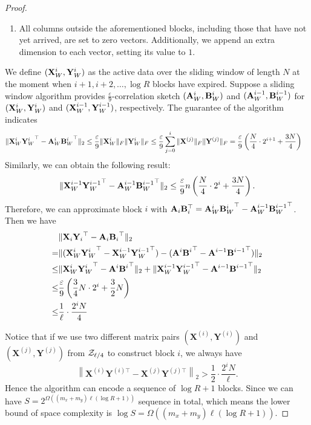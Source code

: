\begin{proof}
\begin{enumerate}
    \item All columns outside the aforementioned blocks, including those that have not yet arrived, are set to zero vectors. Additionally, we append an extra dimension to each vector, setting its value to $1$. 
\end{enumerate}

We define $({\bf X}_W^i,{\bf Y}_W^i)$ as the active data over the sliding window of length $N$ at the moment when $i+1,i+2,\dots,\log{R}$ blocks have expired. Suppose a sliding window algorithm provides $\frac{\varepsilon}{9}$-correlation sketch $({\bf A}_W^i,{\bf B}_W^i)$ and $({\bf A}_W^{i-1},{\bf B}_W^{i-1})$ for $({\bf X}_W^i,{\bf Y}_W^i)$ and $({\bf X}_W^{i-1},{\bf Y}_W^{i-1})$, respectively. The guarantee of the algorithm indicates
\begin{align}
    \| {\bf X}_W^i{{\bf Y}_W^{i}}^\top - {\bf A}_W^i{{\bf B}_W^{i}}^\top \|_2 &\leq \frac{\varepsilon}{9} \|{\bf X}_W^i\|_F\|{\bf Y}_W^i\|_F \leq  \frac{\varepsilon}{9} \sum_{j=0}^i{\|{\bf X}^{(j)}\|_F\|{\bf Y}^{(j)}\|_F} = \frac{\varepsilon}{9}\left( \frac{N}{4}\cdot2^{i+1}+\frac{3N}{4} \right)\nonumber
\end{align}
Similarly, we can obtain the following result:  
\[
\| {\bf X}_W^{i-1} {{\bf Y}_W^{i-1}}^\top - {\bf A}_W^{i-1} {{\bf B}_W^{i-1}}^\top \|_2 \leq \frac{\varepsilon}{9} n \left( \frac{N}{4} \cdot 2^i + \frac{3N}{4} \right).
\]
Therefore, we can approximate block $i$ with ${\bf A}_i{\bf B}_i^\top={\bf A}_W^i{{\bf B}_W^{i}}^\top-{\bf A}_W^{i-1} {{\bf B}_W^{i-1}}^\top$. Then we have
\begin{align}
    &\| {\bf X}_i{{\bf Y}_{i}}^\top - {\bf A}_{i}{{\bf B}_{i}}^\top \|_2 \nonumber\\
    = &\| ({\bf X}_W^i{{\bf Y}_W^{i}}^\top- {\bf X}_W^{i-1}{{\bf Y}_W^{i-1}}^\top) - ({\bf A}^i{{\bf B}^{i}}^\top - {\bf A}^{i-1}{{\bf B}^{i-1}}^\top) \|_2 \nonumber\\
    \leq & \| {\bf X}_W^i{{\bf Y}_W^{i}}^\top- {\bf A}^i{{\bf B}^{i}}^\top\|_2 + \| {\bf X}_W^{i-1}{{\bf Y}_W^{i-1}}^\top - {\bf A}^{i-1}{{\bf B}^{i-1}}^\top \|_2 \nonumber\\
    \leq &\frac{\varepsilon}{9} \left( \frac{3}{4}N\cdot2^i+\frac{3}{2}N \right) \nonumber\\
    \leq &  \frac{1}{\ell} \cdot\frac{2^i N}{4} \nonumber
\end{align}

Notice that if we use two different matrix pairs $(\mathbf{X}^{(i)}, \mathbf{Y}^{(i)})$ and $(\mathbf{X}^{(j)}, \mathbf{Y}^{(j)})$ from ${\mathcal{Z}}_{\ell/4}$ to construct block $i$, we always have 
$$\left\|\mathbf{X}^{(i)} \mathbf{Y}^{(i)\top} - \mathbf{X}^{(j)} \mathbf{Y}^{(j)\top}\right\|_2 > \frac{1}{2}\cdot \frac{2^i N}{\ell}.$$ 
Hence the algorithm can encode a sequence of $\log R+1$ blocks. Since we can have $S=2^{\Omega((m_x+m_y)\ell(\log R+1))}$ sequence in total, which means the lower bound of space complexity is $\log S=\Omega((m_x+m_y)\ell(\log R+1))$.

\end{proof}

